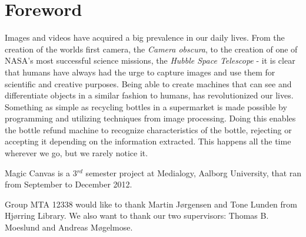 \chapter*{Foreword}
Images and videos have acquired a big prevalence in our daily lives. From the creation of the worlds first camera, the \textit{Camera obscura}, to the creation of one of NASA's most successful science missions, the \textit{Hubble Space Telescope} - it is clear that humans have always had the urge to capture images and use them for scientific and creative purposes. Being able to create machines that can see and differentiate objects in a similar fashion to humans, has revolutionized our lives. Something as simple as recycling bottles in a supermarket is made possible by programming and utilizing techniques from image processing. Doing this enables the bottle refund machine to recognize characteristics of the bottle, rejecting or accepting it depending on the information extracted. This happens all the time wherever we go, but we rarely notice it.

Magic Canvas is a 3$^{rd}$ semester project at Medialogy, Aalborg University, that ran from September to December 2012.

Group MTA 12338 would like to thank Martin J{\o}rgensen and Tone Lunden from Hj{\o}rring Library. We also want to thank our two supervisors: Thomas B. Moeslund and Andreas M{\o}gelmose.